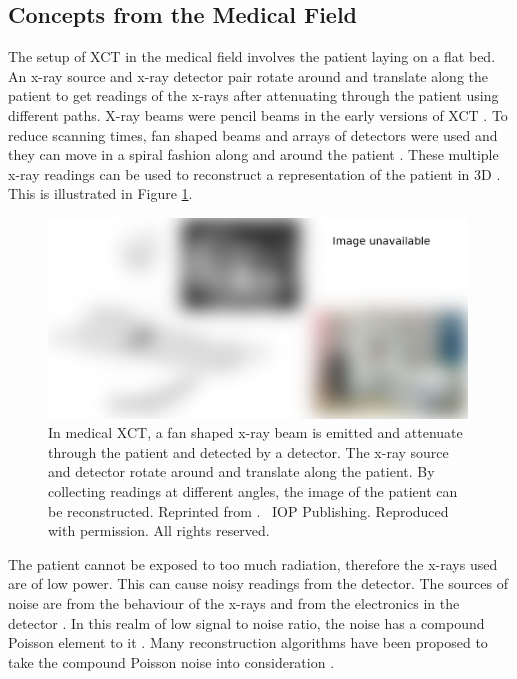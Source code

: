 \subsection{Concepts from the Medical Field}

The setup of XCT \citep{cormack1973reconstruction, hounsfield1973computerized, hounsfield1980computed} in the medical field involves the patient laying on a flat bed. An x-ray source and x-ray detector pair rotate around and translate along the patient to get readings of the x-rays after attenuating through the patient using different paths. X-ray beams were pencil beams in the early versions of XCT \citep{michael2001x}. To reduce scanning times, fan shaped beams and arrays of detectors were used and they can move in a spiral fashion along and around the patient \citep{cierniak2011x}. These multiple x-ray readings can be used to reconstruct a representation of the patient in 3D \citep{zeng2010medical}. This is illustrated in Figure \ref{fig:literature_medicalct}.

\begin{figure}
  \centering
  \includegraphics[width=0.99\textwidth]{../figures/literatureReview/literature_medicalct.png}
  \caption{In medical XCT, a fan shaped x-ray beam is emitted and attenuate through the patient and detected by a detector. The x-ray source and detector rotate around and translate along the patient. By collecting readings at different angles, the image of the patient can be reconstructed. Reprinted from \cite{michael2001x}. \textcopyright\ IOP Publishing. Reproduced with permission. All rights reserved.}
  \label{fig:literature_medicalct}
\end{figure}

The patient cannot be exposed to too much radiation, therefore the x-rays used are of low power. This can cause noisy readings from the detector. The sources of noise are from the behaviour of the x-rays and from the electronics in the detector \citep{yang2010noise}. In this realm of low signal to noise ratio, the noise has a compound Poisson element to it \citep{whiting2002signal, whiting2006properties}. Many reconstruction algorithms have been proposed to take the compound Poisson noise into consideration \citep{elbakri2002statistical, elbakri2003efficient, elbakri2003statistical, lasio2007statistical, xie2008x}.

